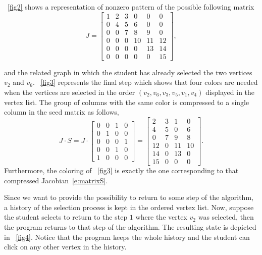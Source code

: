 \documentclass[11pt, twoside,a4paper]{book}
\begin{document}
\figurename~\ref{fig2} shows a representation of nonzero pattern of the possible following matrix
\begin{equation}
\label{e:matrixJ}
J =
\begin{bmatrix}
1 & 2 & 3 & 0 & 0 & 0 \\
0 & 4 & 5 & 6 & 0 & 0 \\
0 & 0 & 7 & 8 & 9 & 0\\
0 & 0 & 0 & 10 & 11 & 12\\
0 & 0 & 0 & 0 & 13 & 14 \\
0 & 0 & 0 & 0 & 0 & 15
\end{bmatrix},
\end{equation}

and the related graph in which the student has already selected the two vertices $v_2$ and $v_6$. \figurename~\ref{fig3} represents the final step which shows that four colors are needed when the vertices are selected in the order $(v_2, v_6, v_3, v_5, v_1, v_4)$ displayed in the vertex list. The group of columns with the same color is compressed to a single column in the seed matrix as follows,
\begin{equation}
\label{e:matrixS}
J \cdot S =
J \cdot
\begin{bmatrix}
0 & 0 & 1 & 0 \\
0 & 1 & 0 & 0 \\
0 & 0 & 0 & 1 \\
0 & 0 & 1 & 0 \\
1 & 0 & 0 & 0
\end{bmatrix}
=
\begin{bmatrix}
2 & 3 & 1 & 0 \\
4 & 5 & 0 & 6 \\
0 & 7 & 9 & 8 \\
12 & 0 & 11 & 10\\
14 & 0 & 13 & 0 \\
15 & 0 & 0 & 0
\end{bmatrix}.
\end{equation}
Furthermore, the coloring of \figurename~\ref{fig3} is exactly the one corresponding to that compressed Jacobian~\eqref{e:matrixS}.

Since we want to provide the possibility to return to some step of the algorithm, a history of the selection process is kept in the ordered vertex list. Now, suppose the student selects to return to the step $1$ where the vertex $v_2$ was selected, then the program returns to that step of the algorithm. The resulting state is depicted in \figurename~\ref{fig4}. Notice that the program keeps the whole history and the student can click on any other vertex in the history.
\end{document}
